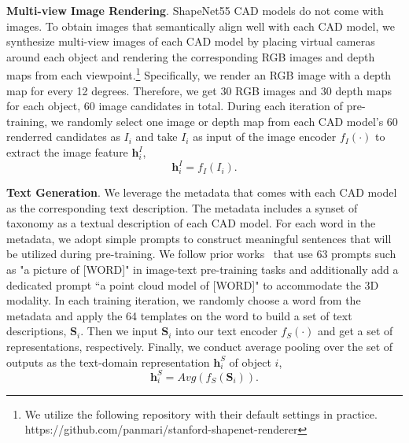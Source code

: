\documentclass[10pt,twocolumn,letterpaper]{article}
\begin{document}
\noindent\textbf{Multi-view Image Rendering}. ShapeNet55 CAD models do not come with images. 
To obtain images that semantically align well with each CAD model, we synthesize multi-view images of each CAD model by placing virtual cameras around each object and rendering the corresponding RGB images and depth maps from each viewpoint.\footnote{We utilize the following repository with their default settings in practice. \newline https://github.com/panmari/stanford-shapenet-renderer} Specifically, we render an RGB image with a depth map for every 12 degrees. Therefore, we get 30 RGB images and 30 depth maps for each object, 60 image candidates in total. During each iteration of pre-training, we randomly select one image or depth map from each CAD model's 60 renderred candidates as $I_i$ and take $I_i$ as input of the image encoder $f_I(\cdot)$ to extract the image feature $\mathbf{h}_i^I$,
\begin{equation}
 \label{eq:image-rep}
   \mathbf{h}_i^{I} = f_I(I_i).
\end{equation}


\noindent\textbf{Text Generation}. We leverage the metadata that comes with each CAD model as the corresponding text description. The metadata includes a synset of taxonomy as a textual description of each CAD model. For each word in the metadata, we adopt simple prompts to construct meaningful sentences that will be utilized during pre-training. We follow prior works~\cite{gu2021open,gao2021towards} that use 63 prompts such as "a picture of [WORD]" in image-text pre-training tasks and additionally add a dedicated prompt ``a point cloud model of [WORD]" to accommodate the 3D modality. 
In each training iteration, we randomly choose a word from the metadata and apply the 64 templates on the word to build a set of text descriptions, $\mathbf{S}_i$.
Then we input $\mathbf{S}_i$ into our text encoder $f_S(\cdot)$ and get a set of representations, respectively. Finally, we conduct average pooling over the set of outputs as the text-domain representation $\mathbf{h}_i^{S}$ of object $i$,
\begin{equation}
 \label{eq:text-rep}
   \mathbf{h}_i^{S} = Avg(f_S(\mathbf{S}_i)).
\end{equation}
\end{document}
